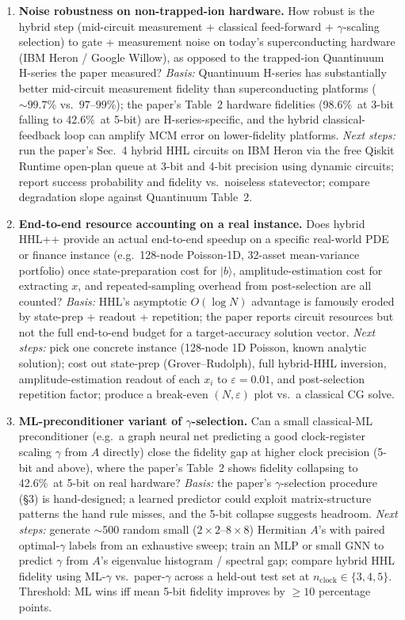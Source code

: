 \begin{enumerate}
\item \textbf{Noise robustness on non-trapped-ion hardware.} How robust
  is the hybrid step (mid-circuit measurement + classical feed-forward
  + $\gamma$-scaling selection) to gate + measurement noise on today's
  superconducting hardware (IBM Heron / Google Willow), as opposed to
  the trapped-ion Quantinuum H-series the paper measured?
  \emph{Basis:} Quantinuum H-series has substantially better mid-circuit
  measurement fidelity than superconducting platforms
  ($\sim 99.7\%$ vs.\ $97$--$99\%$); the paper's Table~2 hardware
  fidelities (98.6\%\ at 3-bit falling to 42.6\%\ at 5-bit) are
  H-series-specific, and the hybrid classical-feedback loop can amplify
  MCM error on lower-fidelity platforms.
  \emph{Next steps:} run the paper's Sec.~4 hybrid HHL circuits on IBM
  Heron via the free Qiskit Runtime open-plan queue at 3-bit and 4-bit
  precision using dynamic circuits; report success probability and
  fidelity vs.\ noiseless statevector; compare degradation slope
  against Quantinuum Table~2.

\item \textbf{End-to-end resource accounting on a real instance.} Does
  hybrid HHL++ provide an actual end-to-end speedup on a specific
  real-world PDE or finance instance (e.g.\ 128-node Poisson-1D, 32-asset
  mean-variance portfolio) once state-preparation cost for $|b\rangle$,
  amplitude-estimation cost for extracting $x$, and repeated-sampling
  overhead from post-selection are all counted?
  \emph{Basis:} HHL's asymptotic $O(\log N)$ advantage is famously
  eroded by state-prep + readout + repetition; the paper reports
  circuit resources but not the full end-to-end budget for a
  target-accuracy solution vector.
  \emph{Next steps:} pick one concrete instance (128-node 1D Poisson,
  known analytic solution); cost out state-prep (Grover--Rudolph),
  full hybrid-HHL inversion, amplitude-estimation readout of each $x_i$
  to $\varepsilon=0.01$, and post-selection repetition factor; produce
  a break-even $(N, \varepsilon)$ plot vs.\ a classical CG solve.

\item \textbf{ML-preconditioner variant of $\gamma$-selection.} Can a
  small classical-ML preconditioner (e.g.\ a graph neural net predicting
  a good clock-register scaling $\gamma$ from $A$ directly) close the
  fidelity gap at higher clock precision (5-bit and above), where the
  paper's Table~2 shows fidelity collapsing to 42.6\%\ at 5-bit on
  real hardware?
  \emph{Basis:} the paper's $\gamma$-selection procedure (\S3) is
  hand-designed; a learned predictor could exploit matrix-structure
  patterns the hand rule misses, and the 5-bit collapse suggests
  headroom.
  \emph{Next steps:} generate $\sim$500 random small ($2\times2$--$8\times8$)
  Hermitian $A$'s with paired optimal-$\gamma$ labels from an exhaustive
  sweep; train an MLP or small GNN to predict $\gamma$ from $A$'s
  eigenvalue histogram / spectral gap; compare hybrid HHL fidelity
  using ML-$\gamma$ vs.\ paper-$\gamma$ across a held-out test set at
  $n_\mathrm{clock}\in\{3,4,5\}$. Threshold: ML wins iff mean 5-bit
  fidelity improves by $\geq 10$ percentage points.
\end{enumerate}
